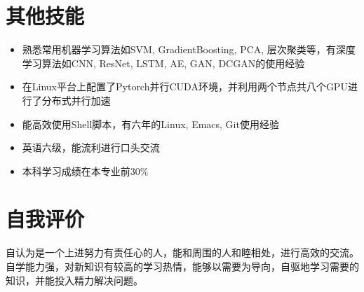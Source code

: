 \documentclass{resume}
\begin{document}
\section{其他技能}
\begin{itemize}%
\item 熟悉常用机器学习算法如SVM, GradientBoosting, PCA, 层次聚类等，有深度学习算法如CNN, ResNet, LSTM, AE, GAN, DCGAN的使用经验
\item 在Linux平台上配置了Pytorch并行CUDA环境，并利用两个节点共八个GPU进行了分布式并行加速
\item 能高效使用Shell脚本，有六年的Linux, Emacs, Git使用经验
\item 英语六级，能流利进行口头交流
\item 本科学习成绩在本专业前30\%
\end{itemize}

\section{自我评价}
\qquad 自认为是一个上进努力有责任心的人，能和周围的人和睦相处，进行高效的交流。自学能力强，对新知识有较高的学习热情，能够以需要为导向，自驱地学习需要的知识，并能投入精力解决问题。


%  
\end{document}
